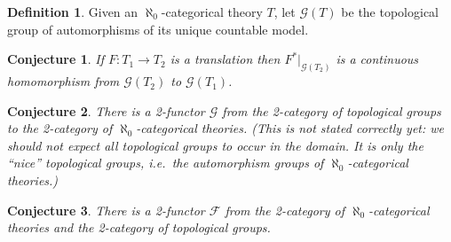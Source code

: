 \documentclass[12pt]{article}
\newtheorem*{conj}{Conjecture}
\theoremstyle{definition}
\newtheorem*{defn}{Definition}
\begin{document}
\newcommand{\3}{\mathcal}

\begin{defn} Given an $\aleph _0$-categorical theory $T$, let
  $\3G (T)$ be the topological group of automorphisms of its unique
  countable model. \end{defn}

\begin{conj} If $F:T_1\to T_2$ is a translation then
  $F^*|_{\3G (T_2)}$ is a continuous homomorphism from $\3G (T_2 )$ to
  $\3G (T_1)$. \end{conj}

\begin{conj} There is a 2-functor $\3G$ from the 2-category of
  topological groups to the 2-category of $\aleph _0$-categorical
  theories. (This is not stated correctly yet: we should not expect
  all topological groups to occur in the domain. It is only the
  ``nice'' topological groups, i.e.\ the automorphism groups of
  $\aleph _0$-categorical theories.) \end{conj}


\begin{conj} There is a 2-functor $\3F$ from the 2-category of
  $\aleph _0$-categorical theories and the 2-category of topological
  groups. \end{conj}







\printbibliography 
\end{document}
